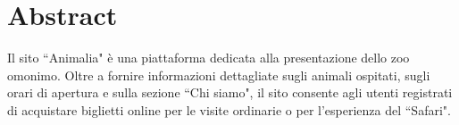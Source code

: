\section{Abstract}
Il sito ``Animalia" è una piattaforma dedicata alla presentazione dello zoo omonimo. Oltre a fornire informazioni dettagliate sugli animali ospitati, sugli orari di apertura e sulla sezione ``Chi siamo", il sito consente agli utenti registrati di acquistare biglietti online per le visite ordinarie o per l’esperienza del ``Safari".